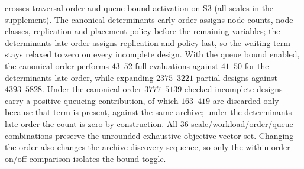 %
\RefOrderTab{} crosses traversal order and queue-bound activation on S3 (all scales in the supplement). The canonical determinants-early order assigns node counts, node classes, replication and placement policy before the remaining variables; the determinants-late order assigns replication and policy last, so the waiting term stays relaxed to zero on every incomplete design. With the queue bound enabled, the canonical order performs $43\text{--}52$ full evaluations against $41\text{--}50$ for the determinants-late order, while expanding $2375\text{--}3221$ partial designs against $4393\text{--}5828$. Under the canonical order $3777\text{--}5139$ checked incomplete designs carry a positive queueing contribution, of which $163\text{--}419$ are discarded only because that term is present, against the same archive; under the determinants-late order the count is zero by construction. All 36 scale/workload/order/queue combinations preserve the unrounded exhaustive objective-vector set. Changing the order also changes the archive discovery sequence, so only the within-order on/off comparison isolates the bound toggle.
